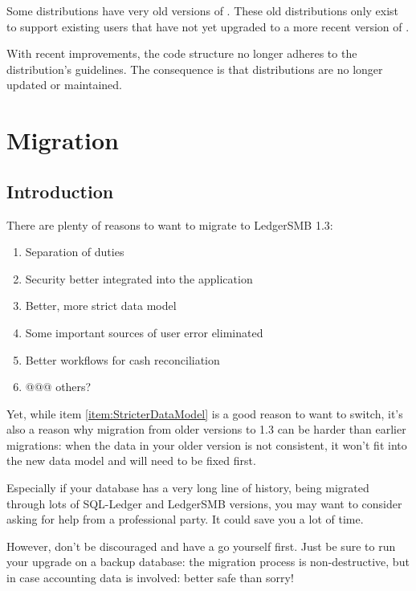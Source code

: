 Some distributions have very old versions of \lsmb. 
These old distributions only exist to support existing users that have not yet upgraded to a more recent version of \lsmb.

With recent \lsmbsp improvements, the \lsmbsp code structure no longer adheres to the distribution's guidelines.
The consequence is that \lsmbsp distributions are no longer updated or maintained.


\chapter{Migration}
\label{app-migration}

\section{Introduction}
\label{sec-migration-introduction}

There are plenty of reasons to want to migrate to LedgerSMB 1.3:

\begin{enumerate}
\item Separation of duties
\item Security better integrated into the application
\item Better, more strict data model
\label{item:StricterDataModel}
\item Some important sources of user error eliminated
\item Better workflows for cash reconciliation
\item @@@ others?
\end{enumerate}

Yet, while item \ref{item:StricterDataModel} is a good reason to want to switch, it's
also a reason why migration from older versions to 1.3 can be harder than earlier
migrations: when the data
in your older version is not consistent, it won't fit into the new data model and
will need to be fixed first.

Especially if your database has a very long line of history, being migrated through
lots of SQL-Ledger and LedgerSMB versions, you may want to consider asking for help
from a professional party. It could save you a lot of time.

However, don't be discouraged and have a go yourself first. Just be sure to run
your upgrade on a backup database: the migration process is non-destructive, but
in case accounting data is involved: better safe than sorry!

